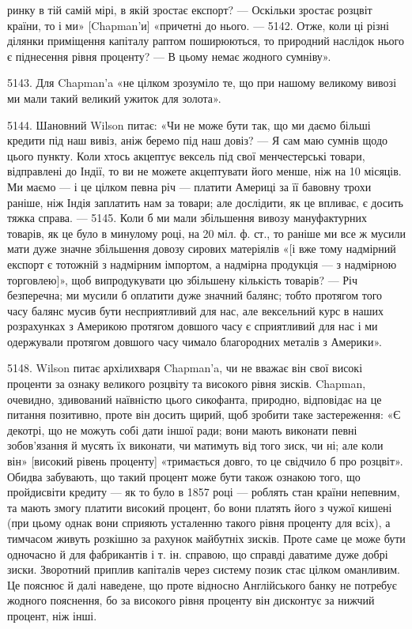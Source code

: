 \parcont{}  %
ринку в тій самій мірі, в якій зростає експорт? — Оскільки зростає розцвіт
країни, то і ми» [Chapman’и] «причетні до нього. — 5142. Отже, коли ці різні
ділянки приміщення капіталу раптом поширюються, то природний наслідок нього
є піднесення рівня проценту? — В цьому немає жодного сумніву».

5143. Для Chapman’a «не цілком зрозуміло те, що при нашому великому
вивозі ми мали такий великий ужиток для золота».

5144. Шановний Wilson питає: «Чи не може бути так, що ми даємо більші
кредити під наш вивіз, аніж беремо під наш довіз? — Я сам маю сумнів щодо цього
пункту. Коли хтось акцептує вексель під свої менчестерські товари, відправлені
до Індії, то ви не можете акцептувати його менше, ніж на 10 місяців.
Ми маємо — і це цілком певна річ — платити Америці за її бавовну трохи раніше,
ніж Індія заплатить нам за товари; але дослідити, як це впливає, є досить
тяжка справа. — 5145. Коли б ми мали збільшення вивозу мануфактурних
товарів, як це було в минулому році, на 20 міл. ф. ст., то раніше ми все ж
мусили мати дуже значне збільшення довозу сирових матеріялів «[і вже тому надмірний
експорт є тотожній з надмірним імпортом, а надмірна продукція — з надмірною
торговлею]», щоб випродукувати цю збільшену кількість товарів? — Річ
безперечна; ми мусили б оплатити дуже значний балянс; тобто протягом того
часу балянс мусив бути несприятливий для нас, але вексельний курс в наших
розрахунках з Америкою протягом довшого часу є сприятливий для нас і ми
одержували протягом довшого часу чимало благородних металів з Америки».

5148. Wilson питає архілихваря Chapman’a, чи не вважає він свої високі
проценти за ознаку великого розцвіту та високого рівня зисків. Chapman, очевидно,
здивований наївністю цього сикофанта, природно, відповідає на це питання
позитивно, проте він досить щирий, щоб зробити таке застереження: «Є декотрі,
що не можуть собі дати іншої ради; вони мають виконати певні зобов'язання
й мусять їх виконати, чи матимуть від того зиск, чи ні; але коли він»
[високий рівень проценту] «тримається довго, то це свідчило б про розцвіт». Обидва
забувають, що такий процент може бути також ознакою того, що пройдисвіти
кредиту — як то було в 1857 році — роблять стан країни непевним, та мають змогу
платити високий процент, бо вони платять його з чужої кишені (при цьому однак
вони сприяють усталенню такого рівня проценту для всіх), а тимчасом живуть
розкішно за рахунок майбутніх зисків. Проте саме це може бути одночасно й для
фабрикантів і т. ін. справою, що справді даватиме дуже добрі зиски. Зворотний
приплив капіталів через систему позик стає цілком оманливим. Це пояснює й
далі наведене, що проте відносно Англійського банку не потребує жодного пояснення,
бо за високого рівня проценту він дисконтує за нижчий процент, ніж інші.

